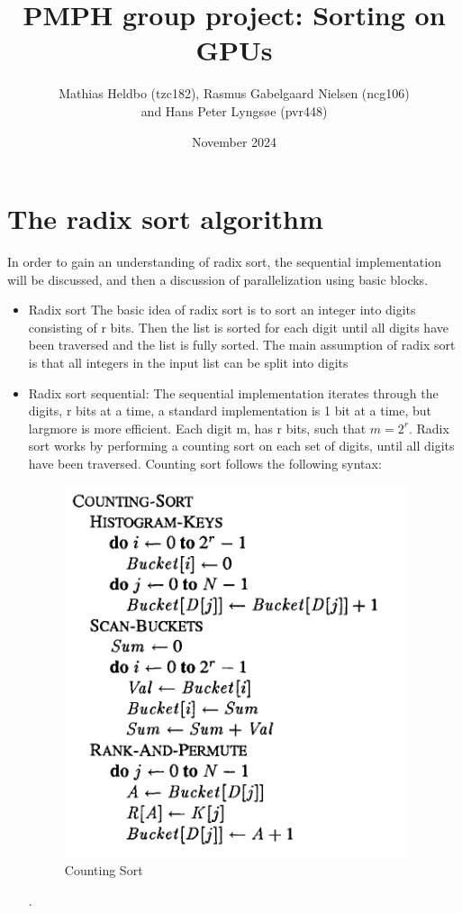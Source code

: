 \documentclass{article}
\title{PMPH group project: Sorting on GPUs}
\author{Mathias Heldbo (tzc182), Rasmus Gabelgaard Nielsen (ncg106) \\ and Hans Peter Lyngsøe (pvr448)}
\date{November 2024}
\begin{document}
\maketitle

\section{The radix sort algorithm }
In order to gain an understanding of radix sort, the sequential implementation will be discussed, and then a discussion of parallelization using basic blocks. 
\begin{itemize}
\item Radix sort
The basic idea of radix sort is to sort an integer into digits consisting of r bits. Then the list is sorted for each digit until all digits have been traversed and the list is fully sorted. The main assumption of radix sort is that all integers in the input list can be split into digits
\item Radix sort sequential:
The sequential implementation iterates through the digits, r bits at a time, a standard implementation is 1 bit at a time, but largmore is more efficient. Each digit m, has r bits, such that $m = 2^r$. Radix sort works by performing a counting sort on each set of digits, until all digits have been traversed. Counting sort follows the following syntax: 
\begin{figure} [H]
    \includegraphics[width=0.5\linewidth]{images/count_sort.PNG}
    \caption{Counting Sort \citep{zagharadixvector}}
    \label{fig:enter-label}
\end{figure}.


\end{itemize}
\end{document}
